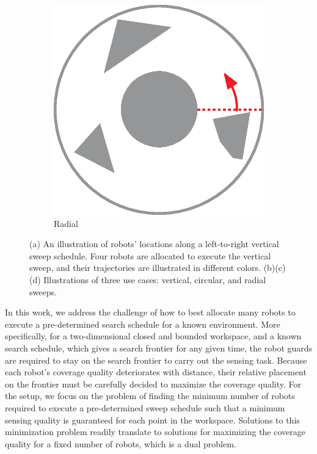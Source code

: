 \begin{figure}[t]
\begin{subfigure}[t]{0.2\textwidth}
         \centering
         \includegraphics[width=\textwidth]{chapters/sc/fig/rotational.eps}
         \caption{Radial}
         \label{fig:sc-circular}
    \end{subfigure}
     
    \vspace{2mm}
    \caption[Illustration of sweep schedules]{(a) An illustration of robots' locations along a left-to-right 
    vertical sweep schedule. Four robots are allocated to execute the vertical sweep, 
    and their trajectories are illustrated in different colors. 
    (b)(c)(d) Illustrations of three use cases: vertical, circular, 
    and radial sweeps.}
    \label{fig:sc-sweep}
\end{figure}

In this work, we address the challenge of how to best allocate 
many robots to execute a pre-determined search schedule for a known environment. 
More specifically, for a two-dimensional closed and bounded workspace, and a known 
search schedule, which gives a search frontier for any given time, the robot guards 
are required to stay on the search frontier to carry out the sensing task. 
%
Because each robot's coverage quality deteriorates with distance, their relative 
placement on the frontier must be carefully decided to maximize the coverage quality. 
%
For the setup, we focus on the problem of finding the minimum number of robots required 
to execute a pre-determined sweep schedule such that a minimum sensing quality is 
guaranteed for each point in the workspace. Solutions to this minimization problem 
readily translate to solutions for maximizing the coverage quality for a fixed number 
of robots, which is a dual problem. 

